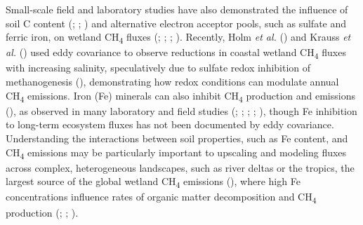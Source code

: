 \documentclass[
  12pt,
]{article}
\begin{document}
Small-scale field and laboratory studies have also demonstrated the
influence of soil C content (; ; ) and alternative electron acceptor pools, such as sulfate and
ferric iron, on wetland CH\textsubscript{4} fluxes
(;
; ; ).
Recently, Holm \emph{et al.} ()
and Krauss \emph{et al.} ()
used eddy covariance to observe reductions in coastal wetland
CH\textsubscript{4} fluxes with increasing salinity, speculatively due
to sulfate redox inhibition of methanogenesis
(), demonstrating how redox conditions can modulate annual
CH\textsubscript{4} emissions. Iron (Fe) minerals can also inhibit
CH\textsubscript{4} production and emissions
(), as observed in
many laboratory and field studies
(;
;
;
;
),
though Fe inhibition to long-term ecosystem fluxes has not been
documented by eddy covariance. Understanding the interactions between
soil properties, such as Fe content, and CH\textsubscript{4} emissions
may be particularly important to upscaling and modeling fluxes across
complex, heterogeneous landscapes, such as river deltas or the tropics,
the largest source of the global wetland CH\textsubscript{4} emissions
(),
where high Fe concentrations influence rates of organic matter
decomposition and CH\textsubscript{4} production
(;
;
).
\end{document}
